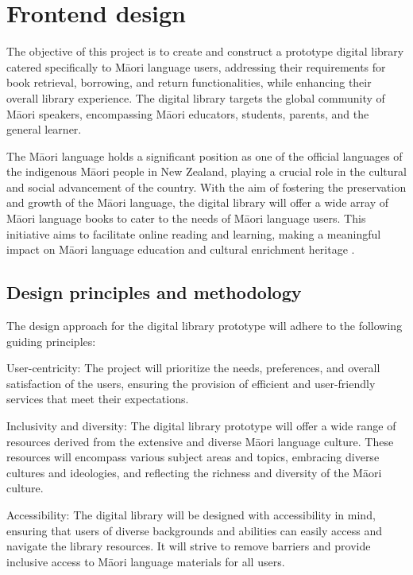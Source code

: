\chapter{Frontend design}

The objective of this project is to create and construct a prototype digital library catered specifically to Māori language users, addressing their requirements for book retrieval, borrowing, and return functionalities, while enhancing their overall library experience. The digital library targets the global community of Māori speakers, encompassing Māori educators, students, parents, and the general learner.

The Māori language holds a significant position as one of the official languages of the indigenous Māori people in New Zealand, playing a crucial role in the cultural and social advancement of the country. With the aim of fostering the preservation and growth of the Māori language, the digital library will offer a wide array of Māori language books to cater to the needs of Māori language users. This initiative aims to facilitate online reading and learning, making a meaningful impact on Māori language education and cultural enrichment heritage \autocite{Discover30:online}.

\section{Design principles and methodology}

The design approach for the digital library prototype will adhere to the following guiding principles:

User-centricity: The project will prioritize the needs, preferences, and overall satisfaction of the users, ensuring the provision of efficient and user-friendly services that meet their expectations.

Inclusivity and diversity: The digital library prototype will offer a wide range of resources derived from the extensive and diverse Māori language culture. These resources will encompass various subject areas and topics, embracing diverse cultures and ideologies, and reflecting the richness and diversity of the Māori culture.

Accessibility: The digital library will be designed with accessibility in mind, ensuring that users of diverse backgrounds and abilities can easily access and navigate the library resources. It will strive to remove barriers and provide inclusive access to Māori language materials for all users.

